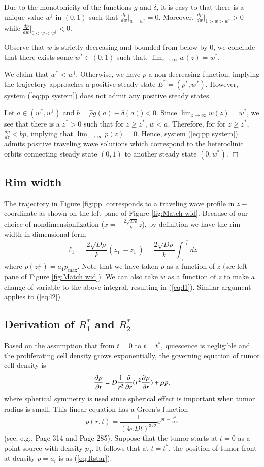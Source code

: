 \documentclass{aims}
\numberwithin{equation}{section}
\begin{document}
Due to the monotonicity of the functions $g$ and $\delta$, it is easy to that there is a unique value $w^{\dagger}$ in $(0, 1)$ such that 
$\frac{dp}{dw}\vert_{w=w^{\dagger}}=0.$ Moreover, $\frac{dp}{dw}\vert_{1>w>w^{\dagger}}>0$ while
$\frac{dp}{dw}\vert_{0<w<w^{\dagger}}<0.$

Observe that $w$ is strictly decreasing and bounded from below by 0, we conclude that there exists some $w^*\in(0,1)$ such that, $\lim_{z \rightarrow \infty} w(z)=w^*$. 

We claim that $w^*<w^{\dagger}.$ Otherwise, we have $p$ a non-decreasing function, implying the trajectory approaches a positive steady state $E^*=(p^*, w^*).$ However, system (\ref{eq:pp system}) does not admit any positive steady states. 

Let $a \in (w^*, w^{\dagger})$ and $b=\hat{\rho}g(a)-\delta(a)) <0.$ Since
$\lim_{z \rightarrow \infty}w(z)=w^*$, we see that there is a $z^*>0$ such that for $z \geq z^*$, $w<a$. Therefore, for for $z \geq z^*$, 
$\frac{dp}{dz}<bp$, implying that $\lim_{z \rightarrow \infty} p(z)=0.$
Hence, system (\ref{eq:pp system}) admits positive traveling wave solutions which correspond to the heteroclinic orbits connecting steady state $(0, 1)$ to another steady state $(0, w^*)$. $\Box$

\subsection*{Rim width}
The trajectory in Figure \ref{fig:pp} corresponds to a traveling wave profile in $z-$coordinate as shown on the left pane of Figure \ref{fig:Match wid}. Because of our choice of nondimensionlization ($x=-\frac{2 \sqrt{D\rho}}{k} z$), by definition we have the rim width in dimensional form  \[\ell_1= \frac{2 \sqrt{D\rho}}{k} (z_1^+ - z_1^-) = \frac{2 \sqrt{D\rho}}{k} \int_{z_1^-}^{z_1^+} dz\] where $p(z^{\pm}_1)=a_1 p_{\max}$. Note that we have taken $p$ as a function of $z$ (see left pane of Figure \ref{fig:Match wid}). We can also take $w$ as a function of $z$ to make a change of variable to the above integral, resulting in (\ref{eq:l1}). Similar argument applies to (\ref{eq:l2})
 
\subsection*{Derivation of $R_1^*$ and $R_2^*$}
Based on the assumption that from $t=0$ to $t=t^{*}$, quiescence is negligible and the proliferating cell density grows exponentially, the governing equation of tumor cell density is \[ \frac{\partial p}{\partial t} =  D\frac{1}{r^2} \frac{\partial}{\partial r} (r^2 \frac{\partial p}{\partial r}) + \rho p,\] where spherical symmetry is used since spherical effect is important when tumor radius is small. This linear equation has a Green's function \[p(r,t)=\frac{1}{(4 \pi D t)^{3/2}} e^{\rho t - \frac{r^2}{4Dt}}\] (see, e.g., \cite{KotBook} Page 314 and \cite{BrittonBook} Page 285). Suppose that the tumor starts at $t=0$ as a point source with density $p_0$. It follows that at $t=t^*$, the position of tumor front at density $p=a_i$  is as (\ref{eq:Rstar}). 
\end{document}
